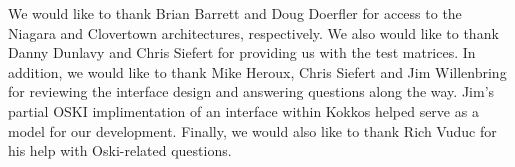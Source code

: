 We would like to thank Brian Barrett and Doug Doerfler for access to the Niagara and Clovertown architectures,
respectively.  We also would like to thank Danny Dunlavy and Chris Siefert for providing us with the test matrices.
In addition, we would like to thank Mike Heroux, Chris Siefert and Jim Willenbring for reviewing the interface design
and answering questions along the way.  Jim's partial OSKI implimentation of an interface within Kokkos helped serve as
a model for our development.  Finally, we would also like to thank Rich Vuduc for his help with Oski-related questions.
